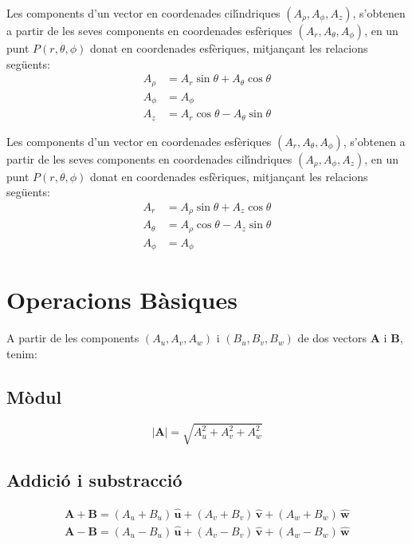 \documentclass[catalan,a4paper,twoside,11pt]{article}
\begin{document}
Les components d'un vector en coordenades cil\'{\i}ndriques  $(A_\rho, A_\phi, A_z)$, s'obtenen a partir de les seves components en coordenades esf\`{e}riques $(A_r, A_\theta, A_\phi)$, en un punt $P(r,\theta,\phi)$ donat en coordenades esf\`{e}riques, mitjan\c{c}ant les relacions seg\"{u}ents:
\begin{subequations}\begin{align}
    A_\rho &= A_r\sin\theta+A_\theta\cos\theta \\
    A_\phi &= A_\phi\\
    A_z &= A_r\cos\theta-A_\theta\sin\theta
\end{align}\end{subequations}

Les components d'un vector en coordenades esf\`{e}riques $(A_r, A_\theta, A_\phi)$, s'obtenen a partir de les seves components en coordenades cil\'{\i}ndriques $(A_\rho, A_\phi, A_z)$, en un punt $P(r,\theta,\phi)$ donat en coordenades esf\`{e}riques, mitjan\c{c}ant les relacions seg\"{u}ents:
\begin{subequations}\begin{align}
    A_r &=  A_\rho\sin\theta+A_z\cos\theta\\
    A_\theta &=  A_\rho\cos\theta-A_z\sin\theta\\
    A_\phi &= A_\phi
\end{align}\end{subequations}


\section{Operacions  B\`{a}siques}
\renewcommand{\va}{\ensuremath{\,\boldsymbol{\hat{u}}}}
\renewcommand{\vb}{\ensuremath{\,\boldsymbol{\hat{v}}}}
\renewcommand{\vc}{\ensuremath{\,\boldsymbol{\hat{w}}}}

A partir de les components $(A_u,A_v,A_w)$ i $(B_u,B_v,B_w)$
de dos vectors $\boldsymbol{A}$ i $\boldsymbol{B}$, tenim:

\subsection{M\`{o}dul}
\vspace{-5mm}
\begin{equation}
    |\boldsymbol{A}|=  \sqrt{A_u^2 + A_v^2 + A_w^2}
\end{equation}

\subsection{Addici\'{o} i substracci\'{o}}
\vspace{-5mm}
\begin{subequations}\begin{align}
    \boldsymbol{A+B}= (A_u+B_u)\va + (A_v+B_v)\vb + (A_w+B_w)\vc \\
    \boldsymbol{A-B}= (A_u-B_u)\va + (A_v-B_v)\vb + (A_w-B_w)\vc
\end{align}\end{subequations}
\end{document}
